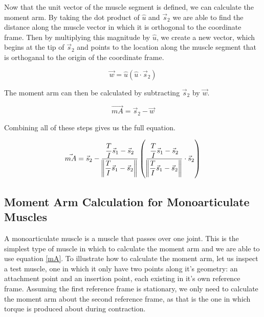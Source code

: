 \documentclass[runningheads]{llncs}
\begin{document}
Now that the unit vector of the muscle segment is defined, we can calculate the moment arm. By taking the dot product of $\hat{u}$ and $\Vec{s}_2$ we are able to find the distance along the muscle vector in which it is orthogonal to the coordinate frame. Then by multiplying this magnitude by $\hat{u}$, we create a new vector, which begins at the tip of $\Vec{s}_2$ and points to the location along the muscle segment that is orthoganal to the origin of the coordinate frame.

\begin{equation}
    \Vec{w} = \hat{u}(\hat{u} \cdot \vec{s}_2)
\end{equation}

The moment arm can then be calculated by subtracting $\Vec{s}_2$ by $\Vec{w}$.

\begin{equation}
    \Vec{mA} = \Vec{s}_2 - \Vec{w}
\end{equation}

Combining all of these steps gives us the full equation.

\begin{equation}
    \Vec{mA} = \Vec{s}_2 - \dfrac{\dfrac{T}{I}\Vec{s}_1 - \Vec{s}_2}{\norm{\dfrac{T}{I}\Vec{s}_1 - \Vec{s}_2}}\left(\dfrac{\dfrac{T}{I}\Vec{s}_1 - \Vec{s}_2}{\norm{\dfrac{T}{I}\Vec{s}_1 - \Vec{s}_2}} \cdot \Vec{s}_2\right)
    \label{mA}
\end{equation} 

\subsection{Moment Arm Calculation for Monoarticulate Muscles}

A monoarticulate muscle is a muscle that passes over one joint. This is the simplest type of muscle in which to calculate the moment arm and we are able to use equation \ref{mA}. To illustrate how to calculate the moment arm, let us inspect a test muscle, one in which it only have two points along it's geometry: an attachment point and an insertion point, each existing in it's own reference frame. Assuming the first reference frame is stationary, we only need to calculate the moment arm about the second reference frame, as that is the one in which torque is produced about during contraction.

\end{document}
